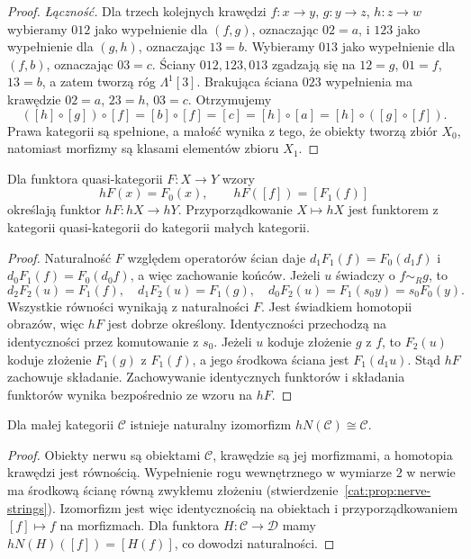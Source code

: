 \begin{proof}
\emph{Łączność.} Dla trzech kolejnych krawędzi $f:x\to y$, $g:y\to z$, $h:z\to w$ wybieramy $012$ jako wypełnienie dla $(f,g)$, oznaczając $02=a$, i $123$ jako wypełnienie dla $(g,h)$, oznaczając $13=b$. Wybieramy $013$ jako wypełnienie dla $(f,b)$, oznaczając $03=c$. Ściany $012,123,013$ zgadzają się na $12=g$, $01=f$, $13=b$, a zatem tworzą róg $\Lambda^1[3]$. Brakująca ściana $023$ wypełnienia ma krawędzie $02=a$, $23=h$, $03=c$. Otrzymujemy
\[
 ([h]\circ[g])\circ[f]=[b]\circ[f]=[c]
 =[h]\circ[a]=[h]\circ([g]\circ[f]).
\]
Prawa kategorii są spełnione, a małość wynika z tego, że obiekty tworzą zbiór $X_0$, natomiast morfizmy są klasami elementów zbioru $X_1$.
\end{proof}

\begin{stwierdzenie}\label{cat:prop:homotopy-category-functor}
Dla funktora quasi-kategorii $F:X\to Y$ wzory
\[
 hF(x)=F_0(x),\qquad hF([f])=[F_1(f)]
\]
określają funktor $hF:hX\to hY$. Przyporządkowanie $X\mapsto hX$ jest funktorem z kategorii quasi-kategorii do kategorii małych kategorii.
\end{stwierdzenie}
\begin{proof}
Naturalność $F$ względem operatorów ścian daje $d_1F_1(f)=F_0(d_1f)$ i $d_0F_1(f)=F_0(d_0f)$, a więc zachowanie końców. Jeżeli $u$ świadczy o $f\sim_R g$, to
\[
 d_2F_2(u)=F_1(f),\quad d_1F_2(u)=F_1(g),\quad
 d_0F_2(u)=F_1(s_0y)=s_0F_0(y).
\]
Wszystkie równości wynikają z naturalności $F$. Jest świadkiem homotopii obrazów, więc $hF$ jest dobrze określony. Identyczności przechodzą na identyczności przez komutowanie z $s_0$. Jeżeli $u$ koduje złożenie $g$ z $f$, to $F_2(u)$ koduje złożenie $F_1(g)$ z $F_1(f)$, a jego środkowa ściana jest $F_1(d_1u)$. Stąd $hF$ zachowuje składanie. Zachowywanie identycznych funktorów i składania funktorów wynika bezpośrednio ze wzoru na $hF$.
\end{proof}

\begin{wniosek}\label{cat:cor:homotopy-nerve}
Dla małej kategorii $\mathcal C$ istnieje naturalny izomorfizm $hN(\mathcal C)\cong\mathcal C$.
\end{wniosek}
\begin{proof}
Obiekty nerwu są obiektami $\mathcal C$, krawędzie są jej morfizmami, a homotopia krawędzi jest równością. Wypełnienie rogu wewnętrznego w wymiarze $2$ w nerwie ma środkową ścianę równą zwykłemu złożeniu (stwierdzenie~\ref{cat:prop:nerve-strings}). Izomorfizm jest więc identycznością na obiektach i przyporządkowaniem $[f]\mapsto f$ na morfizmach. Dla funktora $H:\mathcal C\to\mathcal D$ mamy $hN(H)([f])=[H(f)]$, co dowodzi naturalności.
\end{proof}

